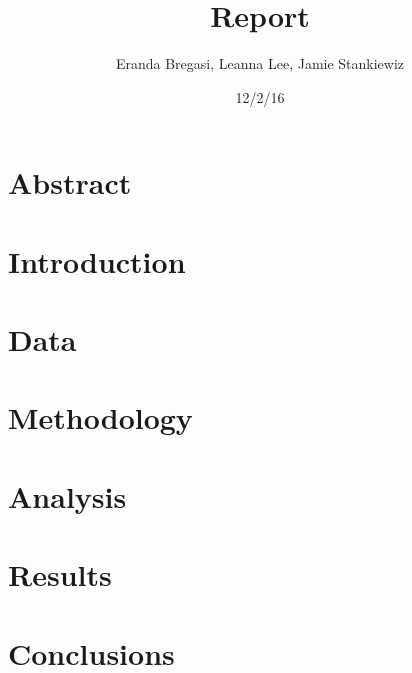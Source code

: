 \documentclass{article}
\begin{document}
\title{Report}
\author{Eranda Bregasi, Leanna Lee, Jamie Stankiewiz}
\date{12/2/16}
\maketitle



\section{Abstract}

\section{Introduction}

\section{Data}

\section{Methodology}

\section{Analysis}

\section{Results}

\section{Conclusions}
\end{document}
